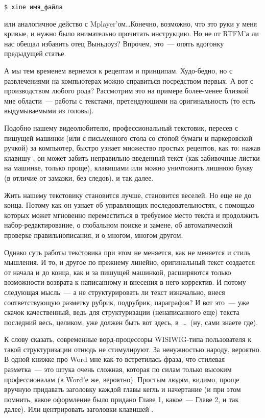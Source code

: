 \medskip\texttt{\$ xine имя\_файла}\medskip

или аналогичное действо с Mplayer'ом\dots Конечно, возможно, что это руки у меня кривые, и нужно было внимательно прочитать инструкцию. Но не от RTFM'а ли нас обещал избавить отец Выньдоуз? Впрочем, это~--- опять вдогонку предыдущей статье.

А мы тем временем вернемся к рецептам и принципам. Худо-бедно, но с развлечениями на компьютерах можно справиться посредством первых. А вот с производством любого рода? Рассмотрим это на примере более-менее близкой мне области~--- работы с текстами, претендующими на оригинальность (то есть выдумываемыми из головы).

Подобно нашему видеолюбителю, профессиональный текстовик, пересев с пишущей машинки (или с письменного стола со стопой бумаги и паркеровской ручкой) за компьютер, быстро узнает множество простых рецептов, как то: нажав клавишу , он может забить неправильно введенный текст (как забивочные листки на машинке, только проще), клавишами  или  можно уничтожить лишнюю букву (в отличие от замазки, без следов), и так далее.

Жить нашему текстовику становится лучше, становится веселей. Но еще не до конца. Потому как он узнает об управляющих последовательностях, с помощью которых может мгновенно переместиться в требуемое место текста и продолжить набор-редактирование, о глобальном поиске и замене, об автоматической проверке правильнописания, и о многом, многом другом.

Однако суть работы текстовика при этом не меняется, как не меняется и стиль мышления. И то, и другое по прежнему линейно, оригинальный текст создается от начала и до конца, как и за пишущей машинкой, расширяются только возможности возврата к написанному и внесения в него корректив. И потому следующая мысль~--- а не структурировать ли текст изначально, внеся соответствующую разметку рубрик, подрубрик, параграфов? И вот это~--- уже скачок качественный, ведь для структуризации (ненаписанного еще) текста последний весь, целиком, уже должен быть вот здесь, в~\dots~(ну, сами знаете где).

К слову сказать, современные ворд-процессоры WISIWIG-типа пользователя к такой структуризации отнюдь не стимулируют. За ненужностью народу, вероятно. В одной книжке про Word мне как-то встретилась фраза, что стилевая разметка~--- это штука очень сложная, которая по силам только высоким профессионалам (в Word'е же, вероятно). Простым людям, видимо, проще вручную придавать заголовку каждой главы кегль и начертание (и при этом помнить, какое оформление было придано Главе 1, какое~--- Главе 2, и так далее). Или центрировать заголовки клавишей .

